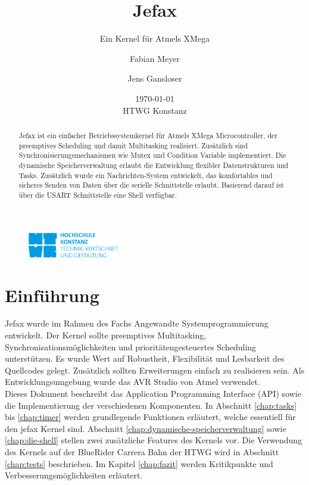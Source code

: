 \documentclass[fontsize=12pt, toc=bibliography, notitlepage]{scrreprt}
\begin{document}
\title{Jefax}
\subtitle{Ein Kernel für Atmels XMega}
\author{Fabian Meyer \and Jens Gansloser}
\date{\today \\ HTWG Konstanz}
\maketitle
\thispagestyle{empty}

\begin{figure}[H]
	\centering
	\includegraphics[width=150px]{images/htwgLogo.jpg}
\end{figure}

\begin{abstract}
Jefax ist ein einfacher Betriebssystemkernel für Atmels XMega Microcontroller, der preemptives Scheduling und damit Multitasking realisiert. Zusätzlich sind Synchronisierungsmechanismen wie Mutex und Condition Variable implementiert. Die dynamische Speicherverwaltung erlaubt die Entwicklung flexibler Datenstrukturen und Tasks. Zusätzlich wurde ein Nachrichten-System entwickelt, das komfortables und sicheres Senden von Daten über die serielle Schnittstelle erlaubt. Basierend darauf ist über die USART Schnittstelle eine Shell verfügbar.
\end{abstract}
\clearpage

\tableofcontents

\chapter{Einführung}
\label{chap:intro}
Jefax wurde im Rahmen des Fachs Angewandte Systemprogrammierung entwickelt. Der Kernel sollte preemptives Multitasking, Synchronisationsmöglichkeiten und prioritätengesteuertes Scheduling unterstützen. Es wurde Wert auf Robustheit, Flexibilität und Lesbarkeit des Quellcodes gelegt. Zusätzlich sollten Erweiterungen einfach zu realisieren sein. Als Entwicklungsumgebung wurde das AVR Studio von Atmel verwendet. \\Dieses Dokument beschreibt das Application Programming Interface (API) sowie die Implementierung der verschiedenen Komponenten. In Abschnitt \ref{chap:tasks} bis \ref{chap:timer} werden grundlegende Funktionen erläutert, welche essentiell für den jefax Kernel sind. Abschnitt \ref{chap:dynamische-speicherverwaltung} sowie \ref{chap:die-shell} stellen zwei zusätzliche Features des Kernels vor. Die Verwendung des Kernels auf der BlueRider Carrera Bahn der HTWG wird in Abschnitt \ref{chap:tests} beschrieben. Im Kapitel \ref{chap:fazit} werden Kritikpunkte und Verbesserungsmöglichkeiten erläutert.
\end{document}
